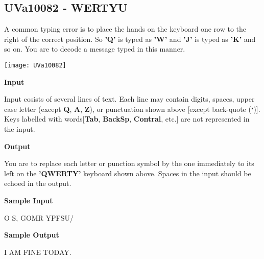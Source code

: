 \graphicspath{{OTHER/Algorithm/image/}}
\subsection{UVa10082 - WERTYU}
A common typing error is to place the hands on the keyboard one row to the right of the correct position. So \textbf{'Q'} is typed as \textbf{'W'} and \textbf{'J'} is typed as \textbf{'K'} and so on. You are to decode a message typed in this manner.

\texttt{[image: UVa10082]}

\begin{flushleft}
{\color{red} \textbf{Input}}
\end{flushleft}
Input cosists of several lines of text. Each line may contain digits, spaces, upper case letter (except \textbf{Q}, \textbf{A}, \textbf{Z}), or punctuation shown above [except back-quote (\textbf{`})]. Keys labelled with words[\textbf{Tab}, \textbf{BackSp}, \textbf{Contral}, etc.] are not represented in the input.

\begin{flushleft}
{\color{red} \textbf{Output}}
\end{flushleft}
You are to replace each letter or punction symbol by the one immediately to its left on the \textbf{'QWERTY'} keyboard shown above. Spaces in the input should be echoed in the output.

\begin{flushleft}
{\color{red} \textbf{Sample Input}}
\end{flushleft}
\begin{flushleft}
O S, GOMR YPFSU/\\
\end{flushleft}

\begin{flushleft}
{\color{red} \textbf{Sample Output}}
\end{flushleft}
\begin{flushleft}
I AM FINE TODAY.
\end{flushleft}

\newpage
